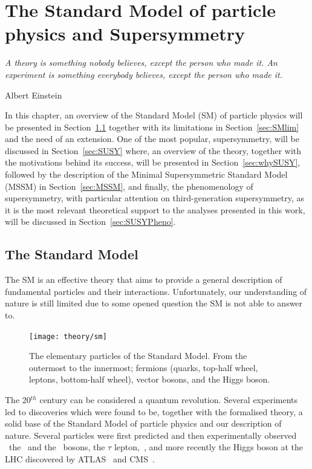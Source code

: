 \chapter{The Standard Model of particle physics and Supersymmetry}
\label{ch:theory} 
\epigraph{\emph{A theory is something nobody believes, except the person who made it. An experiment is something everybody believes, except the person who made it.}} {Albert Einstein}

	In this chapter, an overview of the Standard Model (SM) of particle physics will be presented in Section~\ref{sec:SMov} together with its limitations in Section~\ref{sec:SMlim} and the need of an extension. One of the most popular, supersymmetry, will be discussed in Section~\ref{sec:SUSY} where, an overview of the theory, together with the motivations behind its success, will be presented in Section~\ref{sec:whySUSY}, followed by the description of the Minimal Supersymmetric Standard Model (MSSM) in Section~\ref{sec:MSSM}, and finally, the phenomenology of supersymmetry, with particular attention on third-generation supersymmetry, as it is the most relevant theoretical support to the analyses presented in this work, will be discussed in Section~\ref{sec:SUSYPheno}.



	\section{The Standard Model}
	\label{sec:SMov}

		The SM is an effective theory that aims to provide a general description of fundamental particles and their interactions. Unfortunately, our understanding of nature is still limited due to some opened question the SM is not able to answer to.

		\begin{figure}
			\centering
				\texttt{[image: theory/sm]}
			\caption{\label{fig:sm_el_part} The elementary particles of the Standard Model. From the outermost to the innermost; fermions (quarks, top-half wheel, leptons, bottom-half wheel), vector bosons, and the Higgs boson.} %
		\end{figure}		

		The 20$^{th}$ century can be considered a quantum revolution. Several experiments led to discoveries which were found to be, together with the formalised theory, a solid base of the Standard Model of particle physics and our description of nature. Several particles were first predicted and then experimentally observed \eg\ the \Wboson\ and the \Zboson\ bosons, the $\tau$ lepton,~\cite{Herrero1998}, and more recently the Higgs boson at the LHC discovered by ATLAS~\cite{ATLASHiggs2012} and CMS~\cite{CMSHiggs2012}.

